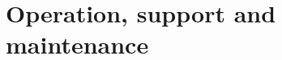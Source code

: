 \documentclass[Main]{subfiles}
\begin{document}
\chapter{Operation, support and maintenance}






\end{document}

